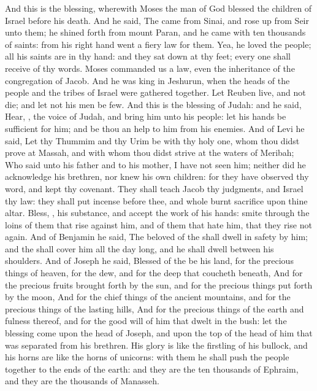 \begin{biblechapter} %
 And this is the blessing, wherewith Moses the man of God blessed the children of Israel before his death.
\verse And he said, The \LORD came from Sinai, and rose up from Seir unto them; he shined forth from mount Paran, and he came with ten thousands of saints: from his right hand went a fiery law for them.
\verse Yea, he loved the people; all his saints are in thy hand: and they sat down at thy feet; every one shall receive of thy words.
\verse Moses commanded us a law, even the inheritance of the congregation of Jacob.
\verse And he was king in Jeshurun, when the heads of the people and the tribes of Israel were gathered together.
\verse Let Reuben live, and not die; and let not his men be few.
\verse And this is the blessing of Judah: and he said, Hear, \LORD, the voice of Judah, and bring him unto his people: let his hands be sufficient for him; and be thou an help to him from his enemies.
\verse And of Levi he said, Let thy Thummim and thy Urim be with thy holy one, whom thou didst prove at Massah, and with whom thou didst strive at the waters of Meribah;
\verse Who said unto his father and to his mother, I have not seen him; neither did he acknowledge his brethren, nor knew his own children: for they have observed thy word, and kept thy covenant.
\verse They shall teach Jacob thy judgments, and Israel thy law: they shall put incense before thee, and whole burnt sacrifice upon thine altar.
\verse Bless, \LORD, his substance, and accept the work of his hands: smite through the loins of them that rise against him, and of them that hate him, that they rise not again.
\verse And of Benjamin he said, The beloved of the \LORD shall dwell in safety by him; and the \LORD shall cover him all the day long, and he shall dwell between his shoulders.
\verse And of Joseph he said, Blessed of the \LORD be his land, for the precious things of heaven, for the dew, and for the deep that coucheth beneath,
\verse And for the precious fruits brought forth by the sun, and for the precious things put forth by the moon,
\verse And for the chief things of the ancient mountains, and for the precious things of the lasting hills,
\verse And for the precious things of the earth and fulness thereof, and for the good will of him that dwelt in the bush: let the blessing come upon the head of Joseph, and upon the top of the head of him that was separated from his brethren.
\verse His glory is like the firstling of his bullock, and his horns are like the horns of unicorns: with them he shall push the people together to the ends of the earth: and they are the ten thousands of Ephraim, and they are the thousands of Manasseh.

\end{biblechapter}
